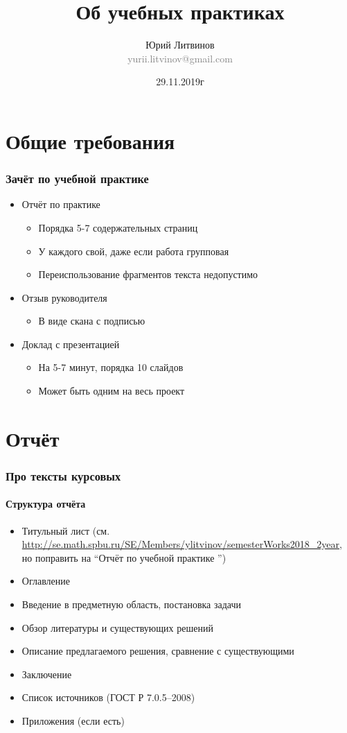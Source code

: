 \documentclass[xetex,mathserif,serif]{beamer}
\title{Об учебных практиках}
\author[Юрий Литвинов]{Юрий Литвинов\\\small{\textcolor{gray}{yurii.litvinov@gmail.com}}}
\date{29.11.2019г}
\begin{document}
\frame{\titlepage}

\section{Общие требования}

	\begin{frame}
	\frametitle{Зачёт по учебной практике}
	\begin{itemize}
		\item Отчёт по практике
		      \begin{itemize}
			      \item Порядка 5-7 содержательных страниц
			      \item У каждого свой, даже если работа групповая
			      \item Переиспользование фрагментов текста недопустимо
		      \end{itemize}
		\item Отзыв руководителя
		      \begin{itemize}
			      \item В виде скана с подписью
		      \end{itemize}
		\item Доклад с презентацией
		      \begin{itemize}
			      \item На 5-7 минут, порядка 10 слайдов
			      \item Может быть одним на весь проект
		      \end{itemize}
	\end{itemize}
	\end{frame}

\section{Отчёт}

	\begin{frame}
	\frametitle{Про тексты курсовых}
	\framesubtitle{Структура отчёта}
	\begin{itemize}
		\item Титульный лист (см. \url{http://se.math.spbu.ru/SE/Members/ylitvinov/semesterWorks2018_2year}, но поправить на ``Отчёт по учебной практике '')
		\item Оглавление
		\item Введение в предметную область, постановка задачи
		\item Обзор литературы и существующих решений
		\item Описание предлагаемого решения, сравнение с существующими
		\item Заключение
		\item Список источников (ГОСТ Р 7.0.5--2008)
		\item Приложения (если есть)
	\end{itemize}
	\end{frame}
\end{document}
